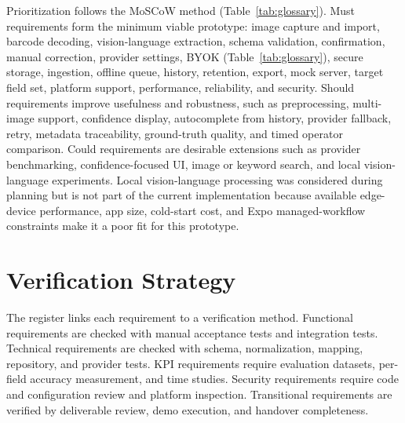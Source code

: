 Prioritization follows the MoSCoW method (Table~\ref{tab:glossary}). Must requirements form the minimum viable prototype: image capture and import, barcode decoding, vision-language extraction, schema validation, confirmation, manual correction, provider settings, BYOK (Table~\ref{tab:glossary}), secure storage, ingestion, offline queue, history, retention, export, mock server, target field set, platform support, performance, reliability, and security. Should requirements improve usefulness and robustness, such as preprocessing, multi-image support, confidence display, autocomplete from history, provider fallback, retry, metadata traceability, ground-truth quality, and timed operator comparison. Could requirements are desirable extensions such as provider benchmarking, confidence-focused UI, image or keyword search, and local vision-language experiments. Local vision-language processing was considered during planning but is not part of the current implementation because available edge-device performance, app size, cold-start cost, and Expo managed-workflow constraints make it a poor fit for this prototype.

\section{Verification Strategy}

The register links each requirement to a verification method. Functional requirements are checked with manual acceptance tests and integration tests. Technical requirements are checked with schema, normalization, mapping, repository, and provider tests. KPI requirements require evaluation datasets, per-field accuracy measurement, and time studies. Security requirements require code and configuration review and platform inspection. Transitional requirements are verified by deliverable review, demo execution, and handover completeness.
